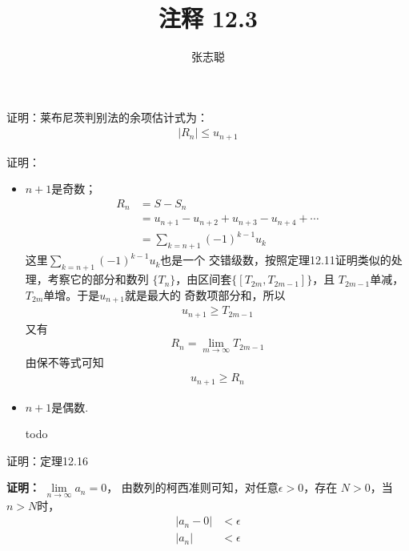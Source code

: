 \documentclass{article}
\begin{document}
\title{注释 12.3}
\author{张志聪}
\maketitle

\begin{zremark}
  证明：莱布尼茨判别法的余项估计式为：
  \begin{align*}
    |R_n| \leq u_{n + 1}
  \end{align*}
\end{zremark}
证明：
\begin{itemize}
  \item $n + 1$是奇数；
        \begin{align*}
          R_n & = S - S_n                                          \\
              & = u_{n + 1} - u_{n+2} + u_{n+3} - u_{n+4} + \cdots \\
              & = \sum\limits_{k = n + 1} (-1)^{k - 1} u_k
        \end{align*}
        这里$\sum\limits_{k = n + 1} (-1)^{k - 1} u_k$也是一个
        交错级数，按照定理12.11证明类似的处理，考察它的部分和数列
        $\{T_n\}$，由区间套$\{[T_{2m}, T_{2m - 1}]\}$，且
        $T_{2m - 1}$单减，$T_{2m}$单增。于是$u_{n + 1}$就是最大的
        奇数项部分和，所以
        \begin{align*}
          u_{n + 1} \geq T_{2m - 1}
        \end{align*}
        又有
        \begin{align*}
          R_n = \lim\limits_{m \to \infty} T_{2m - 1}
        \end{align*}
        由保不等式可知
        \begin{align*}
          u_{n + 1} \geq R_n
        \end{align*}

  \item $n + 1$是偶数.

        todo
\end{itemize}

\begin{zremark}
  证明：定理12.16
\end{zremark}
\textbf{证明：}
$\lim\limits_{n \to \infty} a_n = 0$，
由数列的柯西准则可知，对任意$\epsilon > 0$，存在
$N > 0$，当$n > N$时，
\begin{align*}
  |a_n - 0| & < \epsilon \\
  |a_n|     & < \epsilon
\end{align*}
\end{document}
